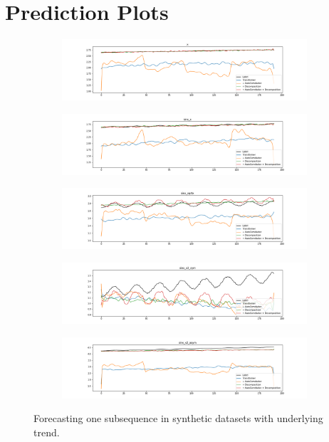 \section{Prediction Plots}\label{app:pred}
\begin{figure}[ht]
    \centering
    \begin{subfigure}{0.75\textwidth}
        \includegraphics[width=\textwidth]{img/pred_x.png}
    \end{subfigure}
    \begin{subfigure}{0.75\textwidth}
        \includegraphics[width=\textwidth]{img/pred_sinx_x.png}
    \end{subfigure}
    \begin{subfigure}{0.75\textwidth}
        \includegraphics[width=\textwidth]{img/pred_sinx_sqrtx.png}
    \end{subfigure}
    \begin{subfigure}{0.75\textwidth}
        \includegraphics[width=\textwidth]{img/pred_sinx_x2_sym.png}
    \end{subfigure}
    \begin{subfigure}{0.75\textwidth}
        \includegraphics[width=\textwidth]{img/pred_sinx_x2_asym.png}
    \end{subfigure}
    \caption{Forecasting one subsequence in synthetic datasets with underlying trend.}
\end{figure}

